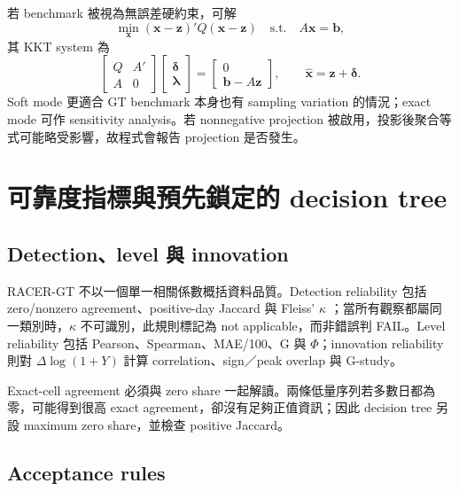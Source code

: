\documentclass[12pt,a4paper,oneside]{article}
\begin{document}
若 benchmark 被視為無誤差硬約束，可解
\begin{equation}
\min_{\bm x}(\bm x-\bm z)'Q(\bm x-\bm z)
\quad\text{s.t.}\quad A\bm x=\bm b,
\end{equation}
其 KKT system 為
\begin{equation}
\begin{bmatrix}
Q&A'\\A&0
\end{bmatrix}
\begin{bmatrix}\bm\delta\\\bm\lambda\end{bmatrix}
=
\begin{bmatrix}0\\\bm b-A\bm z\end{bmatrix},
\qquad \widehat{\bm x}=\bm z+\bm\delta.
\end{equation}
Soft mode 更適合 GT benchmark 本身也有 sampling variation 的情況；exact mode 可作 sensitivity analysis。若 nonnegative projection 被啟用，投影後聚合等式可能略受影響，故程式會報告 projection 是否發生。

\section{可靠度指標與預先鎖定的 decision tree}

\subsection{Detection、level 與 innovation}

RACER-GT 不以一個單一相關係數概括資料品質。Detection reliability 包括 zero/nonzero agreement、positive-day Jaccard 與 Fleiss' $\kappa$ \cite{fleiss1971}；當所有觀察都屬同一類別時，$\kappa$ 不可識別，此規則標記為 not applicable，而非錯誤判 FAIL。Level reliability 包括 Pearson、Spearman、MAE/100、G 與 $\Phi$；innovation reliability 則對 $\Delta\log(1+Y)$ 計算 correlation、sign／peak overlap 與 G-study。

Exact-cell agreement 必須與 zero share 一起解讀。兩條低量序列若多數日都為零，可能得到很高 exact agreement，卻沒有足夠正值資訊；因此 decision tree 另設 maximum zero share，並檢查 positive Jaccard。

\subsection{Acceptance rules}
\end{document}
